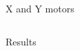 \begin{frame}{X and Y motors}
\begin{columns}[T]
\begin{column}{0.5\textwidth}
        \centering
    \end{column}
\end{columns}
\end{frame}

\begin{frame}{Results}   
\end{frame}